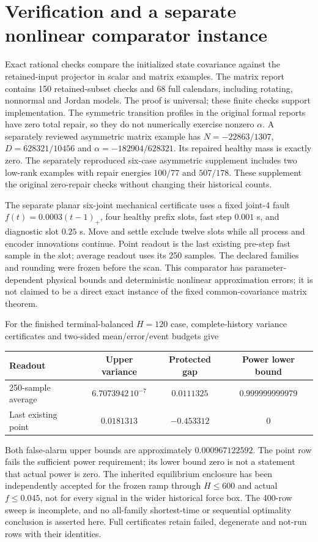 \documentclass[11pt]{article}
\begin{document}
\section{Verification and a separate nonlinear comparator instance}
Exact rational checks compare the initialized state covariance against the
retained-input projector in scalar and matrix examples. The matrix report
contains 150 retained-subset checks and 68 full calendars, including rotating,
nonnormal and Jordan models. The proof is universal; these finite checks
support implementation. The symmetric transition profiles in the original
formal reports have zero total repair, so they do not numerically exercise
nonzero $\alpha$. A separately reviewed asymmetric matrix example has
$N=-22863/1307$, $D=628321/10456$ and $\alpha=-182904/628321$.
Its repaired healthy mass is exactly zero. The separately reproduced
six-case asymmetric supplement includes two low-rank examples with repair
energies $100/77$ and $507/178$. These supplement the original zero-repair
checks without changing their historical counts.

The separate planar six-joint mechanical certificate uses a fixed joint-4
fault $f(t)=0.0003(t-1)_+$, four healthy prefix slots, fast step $0.001$ s,
and diagnostic slot $0.25$ s. Move and settle exclude twelve slots while
all process and encoder innovations continue. Point readout is the last
existing pre-step fast sample in the slot; average readout uses its 250 samples.
The declared families and rounding were frozen before the scan.
This comparator has parameter-dependent physical bounds and deterministic
nonlinear approximation errors; it is not claimed to be a direct exact
instance of the fixed common-covariance matrix theorem.

For the finished terminal-balanced $H=120$ case, complete-history variance
certificates and two-sided mean/error/event budgets give
\begin{center}
\begin{tabular}{lccc}
\toprule
Readout & Upper variance & Protected gap & Power lower bound\\
\midrule
250-sample average & $6.7073942\,10^{-7}$ & $0.0111325$ & $0.999999999979$\\
Last existing point & $0.0181313$ & $-0.453312$ & $0$\\
\bottomrule
\end{tabular}
\end{center}
Both false-alarm upper bounds are approximately $0.000967122592$.
The point row fails the sufficient power requirement; its lower bound zero is
not a statement that actual power is zero. The inherited equilibrium enclosure
has been independently accepted for the frozen ramp through $H\le600$
and actual $f\le0.045$, not for every signal in the wider historical force box.
The 400-row sweep is incomplete, and no all-family shortest-time or sequential
optimality conclusion is asserted here. Full certificates retain failed,
degenerate and not-run rows with their identities.
\end{document}
